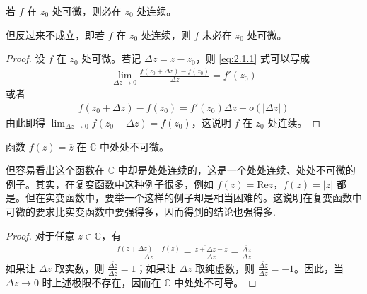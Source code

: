 \documentclass[../../main.tex]{subfiles}%
\begin{document}
\begin{proposition}\label{proposition:全纯函数必连续}
若 \( f \) 在 \( z_0 \) 处可微，则必在 \( z_0 \) 处连续。
\end{proposition}
\begin{remark}
但反过来不成立，即若 \( f \) 在 \( z_0 \) 处连续，则 \( f \) 未必在 \( z_0 \) 处可微。
\end{remark}
\begin{proof}
设 \( f \) 在 \( z_0 \) 处可微。若记 \( \Delta z = z - z_0 \)，则 \eqref{eq:2.1.1} 式可以写成
\begin{align*}
\lim_{\Delta z \to 0} \frac{f(z_0 + \Delta z) - f(z_0)}{\Delta z} = f'(z_0)
\end{align*}
或者
\begin{align}
f(z_0 + \Delta z) - f(z_0) = f'(z_0)\Delta z + o(|\Delta z|) \label{eq:2.1.2}
\end{align}
由此即得 \( \lim_{\Delta z \to 0} f(z_0 + \Delta z) = f(z_0) \)，这说明 \( f \) 在 \( z_0 \) 处连续。
\end{proof}

\begin{example}
函数 \( f(z) = \overline{z} \) 在 \( \mathbb{C} \) 中处处不可微。
\end{example}
\begin{remark}
但容易看出这个函数在 \( \mathbb{C} \) 中却是处处连续的，这是一个处处连续、处处不可微的例子。其实，在复变函数中这种例子很多，例如 \( f(z) = \text{Re}z \)，\( f(z) = |z| \) 都是。但在实变函数中，要举一个这样的例子却是相当困难的。这说明在复变函数中可微的要求比实变函数中要强得多，因而得到的结论也强得多.
\end{remark}
\begin{proof}
对于任意 \( z \in \mathbb{C} \)，有
\begin{align*}
\frac{f(z + \Delta z) - f(z)}{\Delta z} = \frac{\overline{z + \Delta z} - \overline{z}}{\Delta z} = \frac{\overline{\Delta z}}{\Delta z}
\end{align*}
如果让 \( \Delta z \) 取实数，则 \( \frac{\overline{\Delta z}}{\Delta z} = 1 \)；如果让 \( \Delta z \) 取纯虚数，则 \( \frac{\overline{\Delta z}}{\Delta z} = -1 \)。因此，当 \( \Delta z \to 0 \) 时上述极限不存在，因而在 \( \mathbb{C} \) 中处处不可导。
\end{proof}
\end{document}
